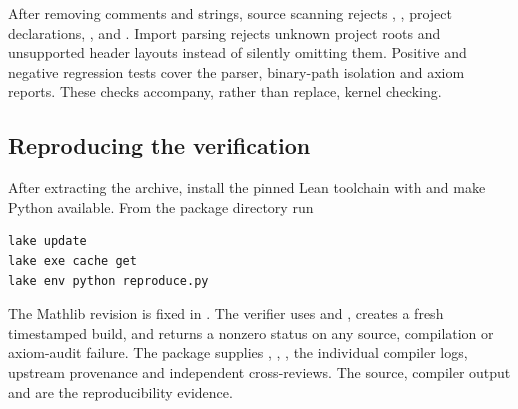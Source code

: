 After removing comments and strings, source scanning rejects
, , project  declarations,
,  and .
Import parsing rejects unknown project roots and unsupported header
layouts instead of silently omitting them.  Positive and negative
regression tests cover the parser, binary-path isolation and axiom
reports.  These checks accompany, rather than replace, kernel checking.

\subsection{Reproducing the verification}\label{lv:reproduce}
After extracting the archive, install the pinned Lean toolchain with
 and make Python available.  From the package directory run
\begin{verbatim}
lake update
lake exe cache get
lake env python reproduce.py
\end{verbatim}
The Mathlib revision is fixed in .
The verifier uses  and
, creates a fresh timestamped build,
and returns a nonzero status on any source, compilation or axiom-audit
failure.  The package supplies ,
, ,
the individual compiler logs, upstream provenance and independent
cross-reviews.  The source, compiler output and
 are the reproducibility evidence.
